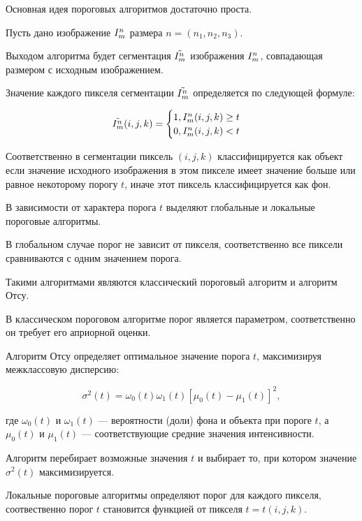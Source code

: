 Основная идея пороговых алгоритмов достаточно проста. 

Пусть дано изображение \(I^n_m\) размера \(n = (n_1, n_2, n_3)\).

Выходом алгоритма будет сегментация \(\tilde{I^n_m}\) изображения \(I^n_m\), совпадающая размером с исходным изображением.

Значение каждого пикселя сегментации \(\tilde{I^n_m}\) определяется по следующей формуле:

\begin{equation} \label{eq:classicthresholding}
    \tilde{I^n_m} (i, j, k) = 
    \begin{cases}
        1, I^n_m(i, j, k) \geq t\\
        0, I^n_m(i, j, k) < t
    \end{cases}
\end{equation}

Соответственно в сегментации пиксель \((i, j, k)\) классифицируется как объект если значение исходного изображения в этом пикселе имеет значение больше или равное некоторому порогу \(t\), иначе этот пиксель классифицируется как фон.

В зависимости от характера порога \(t\) выделяют глобальные и локальные пороговые алгоритмы.

В глобальном случае порог не зависит от пикселя, соответственно все пиксели сравниваются с одним значением порога.

Такими алгоритмами являются классический пороговый алгоритм и алгоритм Отсу.

В классическом пороговом алгоритме порог является параметром, соответственно он требует его априорной оценки.

Алгоритм Отсу \cite{otsu1975threshold} определяет оптимальное значение порога \(t\), максимизируя межклассовую дисперсию:

\begin{equation}
    \sigma^2(t) = \omega_0(t) \omega_1(t) \left[ \mu_0(t) - \mu_1(t) \right]^2,
\end{equation}

где \(\omega_0(t)\) и \(\omega_1(t)\) — вероятности (доли) фона и объекта при пороге \(t\), а \(\mu_0(t)\) и \(\mu_1(t)\) — соответствующие средние значения интенсивности.

Алгоритм перебирает возможные значения \(t\) и выбирает то, при котором значение \(\sigma^2(t)\) максимизируется. 

Локальные пороговые алгоритмы определяют порог для каждого пикселя, соотвественно порог \(t\) становится функцией от пикселя \(t = t(i, j, k)\).

